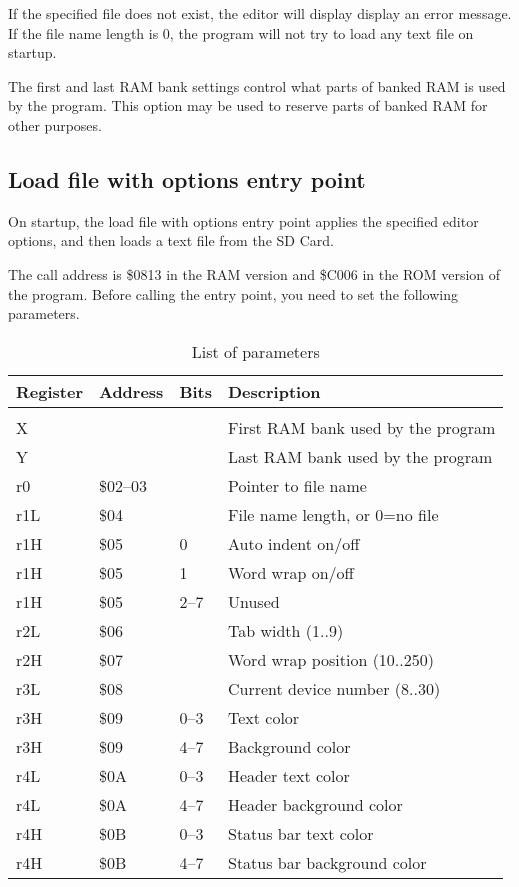 \documentclass{article}
\begin{document}
        \noindent If the specified file does not exist, the editor will display display an
        error message. If the file name length is 0, the program will not try
        to load any text file on startup.

        The first and last RAM bank settings control what parts of banked RAM is
        used by the program. This option may be used to reserve parts of banked RAM
        for other purposes.

    \subsection{Load file with options entry point}

        On startup, the load file with options entry point applies the specified editor options, and then loads
        a text file from the SD Card.

        The call address is \$0813 in the RAM version and \$C006 in the ROM version of the program.
        Before calling the entry point, you need to set the following parameters.

        \begin{longtable}{l l l l}
            \caption{List of parameters} \\
	        \textbf{Register} & \textbf{Address} & \textbf{Bits} & \textbf{Description} \\
	        \hline \\
            X   &          &      & First RAM bank used by the program \\
            Y   &          &      & Last RAM bank used by the program \\
            r0  & \$02--03 &      & Pointer to file name \\
            r1L & \$04     &      & File name length, or 0=no file \\
            r1H & \$05     & 0    & Auto indent on/off \\
            r1H & \$05     & 1    & Word wrap on/off \\
            r1H & \$05     & 2--7 & Unused \\
            r2L & \$06     &      & Tab width (1..9) \\
            r2H & \$07     &      & Word wrap position (10..250) \\
            r3L & \$08     &      & Current device number (8..30) \\
            r3H & \$09     & 0--3 & Text color \\
            r3H & \$09     & 4--7 & Background color \\
            r4L & \$0A     & 0--3 & Header text color \\
            r4L & \$0A     & 4--7 & Header background color \\
            r4H & \$0B     & 0--3 & Status bar text color \\
            r4H & \$0B     & 4--7 & Status bar background color \\
        \end{longtable}
\end{document}
